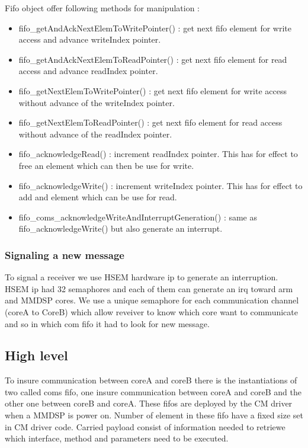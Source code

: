 Fifo object offer following methods for manipulation :
\begin{itemize}
\item fifo\_getAndAckNextElemToWritePointer() : get next fifo element for
write access and advance writeIndex pointer.
\item fifo\_getAndAckNextElemToReadPointer() : get next fifo element for
read access and advance readIndex pointer.
\item fifo\_getNextElemToWritePointer() : get next fifo element for
write access without advance of the writeIndex pointer.
\item fifo\_getNextElemToReadPointer() : get next fifo element for
read access without advance of the readIndex pointer.
\item fifo\_acknowledgeRead() : increment readIndex pointer. This has for effect
to free an element which can then be use for write.
\item fifo\_acknowledgeWrite() : increment writeIndex pointer. This has for
effect to add and element which can be use for read.
\item fifo\_coms\_acknowledgeWriteAndInterruptGeneration() : same as
fifo\_acknowledgeWrite() but also generate an interrupt.
\end{itemize}

\subsubsection{Signaling a new message}
To signal a receiver we use HSEM hardware ip to generate an interruption. HSEM
ip had 32 semaphores and each of them can generate an irq toward arm and MMDSP
cores.
We use a unique semaphore for each communication channel (coreA to CoreB) which
allow reveiver to know which core want to communicate and so in which com fifo
it had to look for new message.

\subsection{High level}
To insure communication between coreA and coreB there is the instantiations of
two called coms fifo, one insure communication between coreA and coreB and the
other one between coreB and coreA. These fifos are deployed by the CM driver
when a MMDSP is power on. Number of element in these fifo have a fixed size set
in CM driver code. Carried payload consist of information needed to retriewe
which interface, method and parameters need to be executed.

